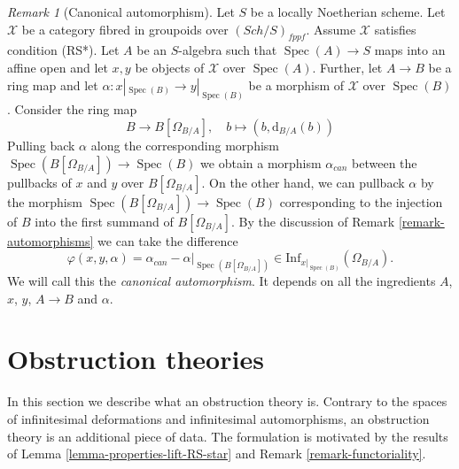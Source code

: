 \documentclass{stacks-project}
\theoremstyle{plain}
\theoremstyle{definition}
\theoremstyle{remark}
\newtheorem{remark}[subsection]{Remark}
\numberwithin{equation}{subsection}
\def\Spec{\mathop{\mathrm{Spec}}}
\def\Sch{\mathit{Sch}}
\begin{document}
\begin{remark}[Canonical automorphism]
\label{remark-canonical-isomorphism}
Let $S$ be a locally Noetherian scheme. Let $\mathcal{X}$ be a category
fibred in groupoids over $(\Sch/S)_{fppf}$. Assume $\mathcal{X}$ satisfies
condition (RS*). Let $A$ be an $S$-algebra such that
$\Spec(A) \to S$ maps into an affine open and let $x, y$ be objects of
$\mathcal{X}$ over $\Spec(A)$. Further, let $A \to B$ be a ring map and
let $\alpha : x|_{\Spec(B)} \to y|_{\Spec(B)}$ be a morphism of
$\mathcal{X}$ over $\Spec(B)$. Consider the ring map
$$
B \longrightarrow B[\Omega_{B/A}],
\quad
b \longmapsto (b, \text{d}_{B/A}(b))
$$
Pulling back $\alpha$ along the corresponding morphism
$\Spec(B[\Omega_{B/A}]) \to \Spec(B)$ we obtain a
morphism $\alpha_{can}$ between the pullbacks of $x$ and $y$ over
$B[\Omega_{B/A}]$. On the other hand, we can pullback $\alpha$
by the morphism $\Spec(B[\Omega_{B/A}]) \to \Spec(B)$ corresponding
to the injection of $B$ into the first summand of $B[\Omega_{B/A}]$.
By the discussion of Remark \ref{remark-automorphisms}
we can take the difference
$$
\varphi(x, y, \alpha) = \alpha_{can} - \alpha|_{\Spec(B[\Omega_{B/A}])} \in
\text{Inf}_{x|_{\Spec(B)}}(\Omega_{B/A}).
$$
We will call this the {\it canonical automorphism}. It depends
on all the ingredients $A$, $x$, $y$, $A \to B$ and $\alpha$.
\end{remark}





\section{Obstruction theories}
\label{section-obstruction-theory}

\noindent
In this section we describe what an obstruction theory is.
Contrary to the spaces of infinitesimal deformations and infinitesimal
automorphisms, an obstruction theory is an additional piece of data.
The formulation is motivated by the results of
Lemma \ref{lemma-properties-lift-RS-star}
and Remark \ref{remark-functoriality}.
\end{document}
